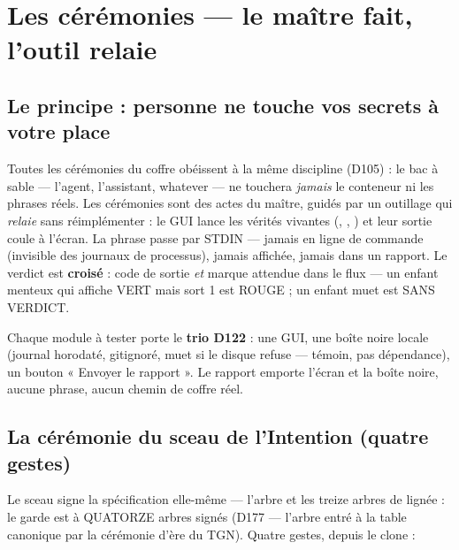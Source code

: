 \section{Les cérémonies — le maître fait, l'outil relaie}\label{sec:ceremonies}

\subsection{Le principe : personne ne touche vos secrets à votre place}

Toutes les cérémonies du coffre obéissent à la même discipline (D105) : le bac à
sable — l'agent, l'assistant, whatever — ne touchera \emph{jamais} le conteneur ni
les phrases réels. Les cérémonies sont des actes du maître, guidés par un outillage
qui \emph{relaie} sans réimplémenter : le GUI lance les vérités vivantes
(, , ) et leur sortie
coule à l'écran. La phrase passe par STDIN — jamais en ligne de commande (invisible
des journaux de processus), jamais affichée, jamais dans un rapport. Le verdict est
\textbf{croisé} : code de sortie \emph{et} marque attendue dans le flux — un enfant
menteux qui affiche VERT mais sort 1 est ROUGE ; un enfant muet est SANS VERDICT.

Chaque module à tester porte le \textbf{trio D122} : une GUI, une boîte noire locale
(journal horodaté, gitignoré, muet si le disque refuse — témoin, pas dépendance), un
bouton « Envoyer le rapport ». Le rapport emporte l'écran et la boîte noire, aucune
phrase, aucun chemin de coffre réel.

\subsection{La cérémonie du sceau de l'Intention (quatre gestes)}\label{sec:cersceau}

Le sceau signe la spécification elle-même — l'arbre  et les treize
arbres de lignée : le garde est à QUATORZE arbres signés (D177 — l'arbre
 entré à la table canonique par la cérémonie d'ère du TGN).
Quatre gestes, depuis le clone :

